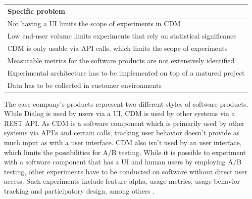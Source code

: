 \documentclass[english]{tktltiki2}
\theoremstyle{definition}
\theoremstyle{remark}
\begin{document}
\begin{center}
    \begin{tabular}{ | p{12cm} |}
    \hline
    \textbf{Specific problem} \\ \hline
    Not having a UI limits the scope of experiments in CDM \\ \hline
    Low end-user volume limits experiments that rely on statistical significance \\ \hline 
	CDM is only usable via API calls, which limits the scope of experiments \\ \hline
	Measurable metrics for the software products are not extensively identified  \\ \hline
	Experimental architecture has to be implemented on top of a matured project \\ \hline
	Data has to be collected in customer environments \\ 
    \hline
    \end{tabular}
\end{center}

The case company's products represent two different styles of software products. While Dialog is used by users via a UI, CDM is used by other systems via a REST API. As CDM is a software component which is primarily used by other systems via API's and certain calls, tracking user behavior doesn't provide as much input as with a user interface. CDM also isn't used by an user interface, which limits the possibilities for A/B testing. While it is possible to experiment with a software component that has a UI and human users by employing A/B testing, other experiments have to be conducted on software without direct user access. Such experiments include feature alpha, usage metrics, usage behavior tracking and participatory design, among others \cite{bosch2012building}.
\end{document}
